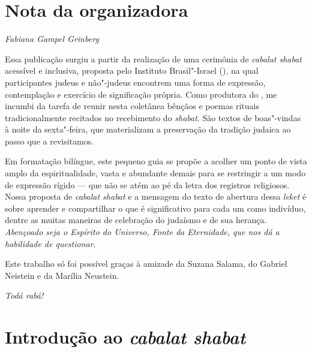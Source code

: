 

\chapter*{Nota da organizadora}


\begin{flushright}
\emph{Fabiana Gampel Grinberg}
\end{flushright}


Essa publicação surgiu a partir da realização de uma cerimônia de \emph{cabalat shabat} acessível e inclusiva, proposta pelo Instituto Brasil"-Israel (), na qual participantes judeus e não"-judeus encontrem uma forma de expressão, contemplação e exercício de significação própria. Como produtora do , me incumbi da tarefa de reunir nesta coletânea bênçãos e poemas rituais tradicionalmente recitados no recebimento do \emph{shabat}. São textos de boas"-vindas à noite da sexta"-feira, que materializam a preservação da tradição judaica ao passo que a revisitamos.

Em formatação bilíngue, este pequeno guia se propõe a acolher um ponto de vista amplo da espiritualidade, vasta e abundante demais para se restringir a um modo de expressão rígido --- que não se atém ao pé da letra dos registros religiosos. Nossa proposta de \emph{cabalat shabat} e a mensagem do texto de abertura dessa \emph{leket} é sobre aprender e compartilhar o que é significativo para cada um como indivíduo, dentre as muitas maneiras de celebração do judaísmo e de sua herança. \emph{Abençoado seja o Espírito do Universo, Fonte da Eternidade, que nos dá a habilidade de questionar}.

Este trabalho só foi possível graças à amizade da Suzana Salama, do Gabriel Neistein e da Marília Neustein.

\medskip

\emph{Todá rabá!}


\chapter*{Introdução ao \emph{cabalat shabat}}


